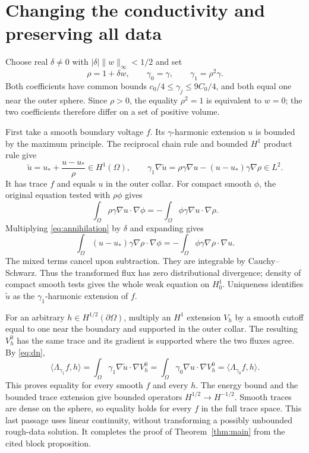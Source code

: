 \documentclass[10pt]{article}
\begin{document}
\section{Changing the conductivity and preserving all data}
Choose real $\delta\ne0$ with $|\delta|\|w\|_\infty<1/2$ and set
\[
\rho=1+\delta w,\qquad \gamma_0=\gamma,\qquad \gamma_1=\rho^2\gamma.
\]
Both coefficients have common bounds $c_0/4\leq\gamma_j\leq9C_0/4$, and both equal one near the outer sphere. Since $\rho>0$, the equality $\rho^2=1$ is equivalent to $w=0$; the two coefficients therefore differ on a set of positive volume.

First take a smooth boundary voltage $f$. Its $\gamma$-harmonic extension $u$ is bounded by the maximum principle. The reciprocal chain rule and bounded $H^1$ product rule give
\[
\widetilde u=u_*+\frac{u-u_*}{\rho}\in H^1(\Omega),\qquad
\gamma_1\nabla\widetilde u
=\rho\gamma\nabla u-(u-u_*)\gamma\nabla\rho\in L^2.
\]
It has trace $f$ and equals $u$ in the outer collar. For compact smooth $\phi$, the original equation tested with $\rho\phi$ gives
\[
\int_\Omega\rho\gamma\nabla u\cdot\nabla\phi
=-\int_\Omega\phi\gamma\nabla u\cdot\nabla\rho.
\]
Multiplying \eqref{eq:annihilation} by $\delta$ and expanding gives
\[
\int_\Omega(u-u_*)\gamma\nabla\rho\cdot\nabla\phi
=-\int_\Omega\phi\gamma\nabla\rho\cdot\nabla u.
\]
The mixed terms cancel upon subtraction. They are integrable by Cauchy--Schwarz. Thus the transformed flux has zero distributional divergence; density of compact smooth tests gives the whole weak equation on $H^1_0$. Uniqueness identifies $\widetilde u$ as the $\gamma_1$-harmonic extension of $f$.

For an arbitrary $h\in H^{1/2}(\partial\Omega)$, multiply an $H^1$ extension $V_h$ by a smooth cutoff equal to one near the boundary and supported in the outer collar. The resulting $V_h^0$ has the same trace and its gradient is supported where the two fluxes agree. By \eqref{eq:dn},
\[
\langle\Lambda_{\gamma_1}f,h\rangle
=\int_\Omega\gamma_1\nabla\widetilde u\cdot\nabla V_h^0
=\int_\Omega\gamma_0\nabla u\cdot\nabla V_h^0
=\langle\Lambda_{\gamma_0}f,h\rangle.
\]
This proves equality for every smooth $f$ and every $h$. The energy bound and the bounded trace extension give bounded operators $H^{1/2}\to H^{-1/2}$. Smooth traces are dense on the sphere, so equality holds for every $f$ in the full trace space. This last passage uses linear continuity, without transforming a possibly unbounded rough-data solution. It completes the proof of Theorem~\ref{thm:main} from the cited block proposition.
\end{document}
